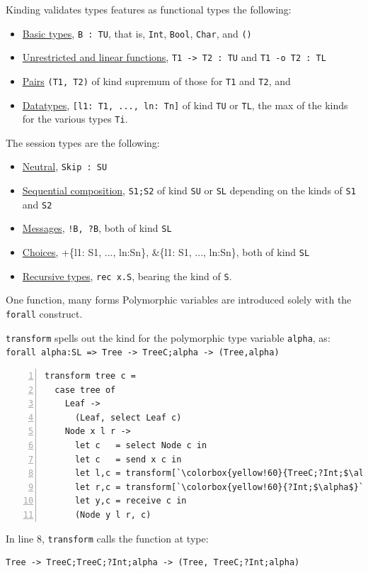 \documentclass[10pt]{beamer}
\begin{document}
\begin{frame}{Kinding validates types}
\freest{} features as functional types the following:
\begin{itemize}
\item \underline{Basic types}, \lstinline|B : TU|, that is, \lstinline|Int|,
  \lstinline|Bool|, \lstinline|Char|, and \lstinline|()|
\item \underline{Unrestricted and linear functions}, \lstinline|T1 -> T2 : TU| and
  \lstinline|T1 -o T2 : TL|
\item \underline{Pairs} \lstinline|(T1, T2)| of kind
  supremum of those for
  \lstinline|T1| and \lstinline|T2|, and
\item \underline{Datatypes}, \lstinline|[l1: T1, ..., ln: Tn]| of kind
  \lstinline|TU| or \lstinline|TL|, the max of the kinds for the
  various types \lstinline|Ti|.
\end{itemize}
\pause

The session types are the following:
\begin{itemize}
\item \underline{Neutral}, \lstinline|Skip : SU|
\item \underline{Sequential composition}, \lstinline|S1;S2| of kind \lstinline|SU|
  or \lstinline|SL| depending on the kinds of \lstinline|S1| and
  \lstinline|S2|
\item  \underline{Messages}, \lstinline|!B, ?B|, both of kind \lstinline|SL|
\item \underline{Choices}, +\{l1: S1, ..., ln:Sn\}, \&\{l1: S1, ..., ln:Sn\},
  both of kind \lstinline|SL|
\item \underline{Recursive types}, \lstinline|rec x.S|, bearing the kind of
  \lstinline|S|.
\end{itemize}
	
\end{frame}

\begin{frame}[fragile]{One function, many forms}
	Polymorphic variables are introduced solely with the \lstinline|forall| construct.
	
	\lstinline|transform| spells out the kind for the polymorphic type variable \lstinline|alpha|, as:
	\lstinline|forall alpha:SL => Tree -> TreeC;alpha -> (Tree,alpha)|

\pause
\begin{lstlisting}[numbers=left, xleftmargin=0.7cm, escapeinside=\`\`]
transform tree c =
  case tree of
    Leaf ->
      (Leaf, select Leaf c)
    Node x l r ->
      let c   = select Node c in
      let c   = send x c in 
      let l,c = transform[`\colorbox{yellow!60}{TreeC;?Int;$\alpha$}`] l c in
      let r,c = transform[`\colorbox{yellow!60}{?Int;$\alpha$}`] r c in
      let y,c = receive c in
      (Node y l r, c)
\end{lstlisting}

\pause
In line 8, \lstinline|transform| calls the function at type:
\begin{lstlisting}
Tree -> TreeC;TreeC;?Int;alpha -> (Tree, TreeC;?Int;alpha)
\end{lstlisting}
	
\end{frame}
\end{document}
